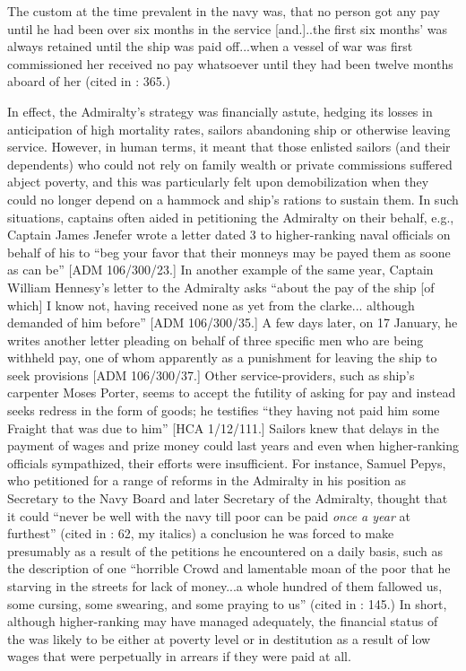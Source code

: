The custom at the time prevalent in the navy was, that no person got any pay until he had been over six months in the service [and.]..the first six months’ was always retained until the ship was paid off...when a vessel of war was first commissioned her  received no pay whatsoever until they had been twelve months aboard of her (cited in \citealt{AdkinsAdkins2008}: 365.)

In effect, the Admiralty’s strategy was financially astute, hedging its losses in anticipation of high mortality rates, sailors abandoning ship or otherwise leaving service. However, in human terms, it meant that those enlisted sailors (and their dependents) who could not rely on family wealth or private commissions suffered abject poverty, and this was particularly felt upon demobilization when they could no longer depend on a hammock and ship’s rations to sustain them. In such situations, captains often aided in petitioning the Admiralty on their behalf, e.g., Captain James Jenefer wrote a letter dated 3 \citealt{June1674} to higher-ranking naval officials on behalf of his  to “beg your favor that their monneys may be payed them as soone as can be” [ADM 106/300/23.] In another example of the same year, Captain William Hennesy’s letter to the Admiralty asks “about the pay of the ship [of which] I know not, having received none as yet from the clarke... although demanded of him before” [ADM 106/300/35.] A few days later, on 17 January, he writes another letter pleading on behalf of three specific men who are being withheld pay, one of whom apparently as a punishment for leaving the ship to seek provisions [ADM 106/300/37.] Other service-providers, such as ship’s carpenter Moses Porter, seems to accept the futility of asking for pay and instead seeks redress in the form of goods; he testifies “they having not paid him some Fraight that was due to him” [HCA 1/12/111.] Sailors knew that delays in the payment of wages and prize money could last years and even when higher-ranking officials sympathized, their efforts were insufficient. For instance, Samuel Pepys, who petitioned for a range of reforms in the Admiralty in his position as Secretary to the Navy Board and later Secretary of the Admiralty, thought that it could  “never be well with the navy till poor  can be paid \textit{once a year} at furthest” (cited in \citealt{Palmer1986}: 62, my italics) a conclusion he was forced to make presumably as a result of the petitions he encountered on a daily basis, such as the description of one “horrible Crowd and lamentable moan of the poor  that he starving in the streets for lack of money...a whole hundred of them fallowed us, some cursing, some swearing, and some praying to us” (cited in \citealt{Lincoln2015}: 145.) In short, although higher-ranking  may have managed adequately, the financial status of the  was likely to be either at poverty level or in destitution as a result of low wages that were perpetually in arrears if they were paid at all.  

